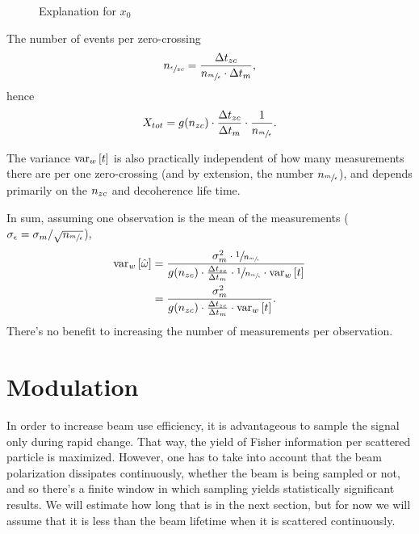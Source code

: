 \documentclass{article}
\newcommand{\obs}{\epsilon}
\newcommand{\meas}{m}
\begin{document}
\begin{figure}[h]
	\centering
	\caption{Explanation for $x_0$\label{fig:x0Expl}}
\end{figure}

The number of events per zero-crossing 
\[
	\Nozc = \frac{\Delta t_{zc}}{\Nmo\cdot \Delta t_{\meas}},
\]
hence
\[
	X_{tot} = g(\Nzc) \cdot \frac{\Delta t_{zc}}{\Delta t_{\meas}}\cdot \frac{1}{\Nmo}.
\]

The variance $\var[w]{t}$ is also practically independent of how many measurements there are per one zero-crossing (and by extension, the number $\Nmo$), and depends primarily on the $n_{zc}$ and decoherence life time.

In sum, assuming one observation is the mean of the measurements ($\SD{\obs} = \SD{\meas}/\sqrt{\Nmo}$), 
\begin{align*}
	\var[w]{\hat{\omega}} &= \frac{\SD{\meas}^2\cdot \sfrac{1}{\Nmo}}{g(\Nzc)\cdot \frac{\Delta t_{zc}}{\Delta t_{\meas}}\cdot \sfrac{1}{\Nmo} \cdot \var[w]{t}} \\
		&= \frac{\SD{\meas}^2}{g(\Nzc)\cdot \frac{\Delta t_{zc}}{\Delta t_{\meas}} \cdot \var[w]{t}}.
\end{align*}
There's no benefit to increasing the number of measurements per observation.

\section{Modulation}

In order to increase beam use efficiency, it is advantageous to sample the signal only during rapid change. That way, the yield of Fisher information per scattered particle is maximized. However, one has to take into account that the beam polarization dissipates continuously, whether the beam is being sampled or not, and so there's a finite window in which sampling yields statistically significant results. We will estimate how long that is in the next section, but for now we will assume that it is less than the beam lifetime when it is scattered continuously.
\end{document}
